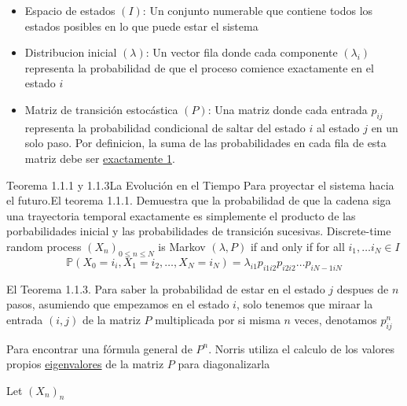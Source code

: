 \documentclass[10pt,a4paper]{article}
\begin{document}
\begin{itemize}
    \item Espacio de estados $(I)$: Un conjunto numerable que contiene  todos los estados posibles en lo que puede estar el sistema
    \item Distribucion inicial $(\lambda)$: Un vector fila donde cada componente $(\lambda_{i})$ representa la probabilidad de que el proceso comience
    exactamente en el estado $i$
    \item Matriz de transición estocástica $(P)$: Una matriz donde cada entrada $p_{ij}$ representa la probabilidad condicional de saltar del estado $i$ al estado $j$ en un solo paso.
    Por definicion, la suma de las probabilidades en cada fila de esta matriz debe ser \ul{exactamente 1}.
\end{itemize}

\begin{mytheo}{Teorema 1.1.1 y 1.1.3}{La Evolución en el Tiempo}
    Para proyectar el sistema hacia el futuro.El teorema 1.1.1. Demuestra que la probabilidad de que la cadena siga una trayectoria temporal exactamente es simplemente el producto de las porbabilidades 
    inicial y las probabilidades de transición sucesivas.
    Discrete-time random process $\left( X_{n}\right)_{0 \leq n \leq N}$ is Markov $(\lambda,P)$ if and only
    if for all $i_{1}, \dots i _{N} \in I $
    \[ \mathbb{P}\left( X_{0}=i_{i}, X_{1}=i_{2}, \dots , X_{N}=i_{N} \right) = \lambda_{i1}p_{i1i2}p_{i2i2} \dots p_{iN-1iN} \]
    
    El Teorema 1.1.3. Para saber la probabilidad de estar en el estado $j$ despues de $n$ pasos, asumiendo que empezamos en el estado $i$, solo tenemos que miraar
    la entrada \( (i,j) \) de la matriz $P$ multiplicada por si misma $n$ veces, denotamos \(p_{ij}^{n}\)

    Para encontrar una fórmula general de \( P^{n} \). Norris utiliza el calculo de los valores propios
    \ul{eigenvalores} de la matriz $P$ para diagonalizarla

    Let \( \left( X_{n} \right)_{n} \)


\end{mytheo}
\end{document}
